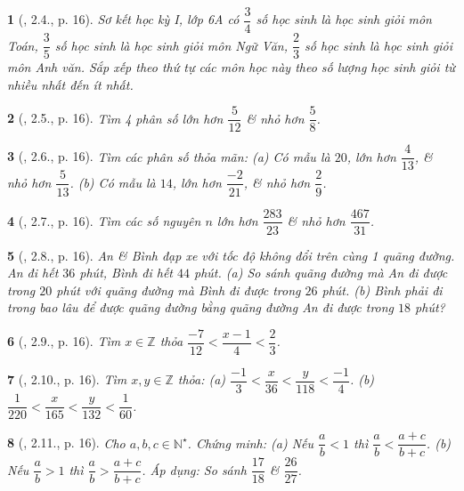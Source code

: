 \documentclass{article}
\newtheorem{baitoan}{}
\begin{document}
\begin{baitoan}[\cite{Binh_boi_duong_Toan_6_tap_2}, 2.4., p. 16]
	Sơ kết học kỳ I, lớp 6A có $\dfrac{3}{4}$ số học sinh là học sinh giỏi môn Toán, $\dfrac{3}{5}$ số học sinh là học sinh giỏi môn Ngữ Văn, $\dfrac{2}{3}$ số học sinh là học sinh giỏi môn Anh văn. Sắp xếp theo thứ tự các môn học này theo số lượng học sinh giỏi từ nhiều nhất đến ít nhất.
\end{baitoan}

\begin{baitoan}[\cite{Binh_boi_duong_Toan_6_tap_2}, 2.5., p. 16]
	Tìm 4 phân số lớn hơn $\dfrac{5}{12}$ \& nhỏ hơn $\dfrac{5}{8}$.
\end{baitoan}

\begin{baitoan}[\cite{Binh_boi_duong_Toan_6_tap_2}, 2.6., p. 16]
	Tìm các phân số thỏa mãn: (a) Có mẫu là $20$, lớn hơn $\dfrac{4}{13}$, \& nhỏ hơn $\dfrac{5}{13}$. (b) Có mẫu là $14$, lớn hơn $\dfrac{-2}{21}$, \& nhỏ hơn $\dfrac{2}{9}$.
\end{baitoan}

\begin{baitoan}[\cite{Binh_boi_duong_Toan_6_tap_2}, 2.7., p. 16]
	Tìm các số nguyên $n$ lớn hơn $\dfrac{283}{23}$ \& nhỏ hơn $\dfrac{467}{31}$.
\end{baitoan}

\begin{baitoan}[\cite{Binh_boi_duong_Toan_6_tap_2}, 2.8., p. 16]
	An \& Bình đạp xe với tốc độ không đổi trên cùng 1 quãng đường. An đi hết $36$ phút, Bình đi hết $44$ phút. (a) So sánh quãng đường mà An đi được trong $20$ phút với quãng đường mà Bình đi được trong $26$ phút. (b) Bình phải đi trong bao lâu để được quãng đường bằng quãng đường An đi được trong $18$ phút?
\end{baitoan}

\begin{baitoan}[\cite{Binh_boi_duong_Toan_6_tap_2}, 2.9., p. 16]
	Tìm $x\in\mathbb{Z}$ thỏa $\dfrac{-7}{12} < \dfrac{x - 1}{4} < \dfrac{2}{3}$.
\end{baitoan}

\begin{baitoan}[\cite{Binh_boi_duong_Toan_6_tap_2}, 2.10., p. 16]
	Tìm $x,y\in\mathbb{Z}$ thỏa: (a) $\dfrac{-1}{3} < \dfrac{x}{36} < \dfrac{y}{118} < \dfrac{-1}{4}$. (b) $\dfrac{1}{220} < \dfrac{x}{165} < \dfrac{y}{132} < \dfrac{1}{60}$.
\end{baitoan}

\begin{baitoan}[\cite{Binh_boi_duong_Toan_6_tap_2}, 2.11., p. 16]
	Cho $a,b,c\in\mathbb{N}^\star$. Chứng minh: (a) Nếu $\dfrac{a}{b} < 1$ thì $\dfrac{a}{b} < \dfrac{a + c}{b + c}$. (b) Nếu $\dfrac{a}{b} > 1$ thì $\dfrac{a}{b} > \dfrac{a + c}{b + c}$. Áp dụng: So sánh $\dfrac{17}{18}$ \& $\dfrac{26}{27}$.
\end{baitoan}
\end{document}
